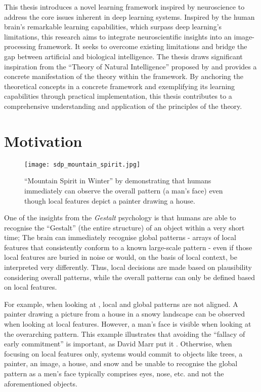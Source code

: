 This thesis introduces a novel learning framework inspired by neuroscience to address the core issues inherent in deep learning systems. Inspired by the human brain's remarkable learning capabilities, which surpass deep learning's limitations, this research aims to integrate neuroscientific insights into an image-processing framework. It seeks to overcome existing limitations and bridge the gap between artificial and biological intelligence. The thesis draws significant inspiration from the ``Theory of Natural Intelligence'' proposed by  and provides a concrete manifestation of the theory within the framework. By anchoring the theoretical concepts in a concrete framework and exemplifying its learning capabilities through practical implementation, this thesis contributes to a comprehensive understanding and application of the principles of the theory.

\section{Motivation}
\begin{figure}[h]
    \centering
    \texttt{[image: sdp\_mountain\_spirit.jpg]}
    \caption[``Mountain Spirit in Winter'' by Sandro del Prete]{``Mountain Spirit in Winter'' by  demonstrating that humans immediately can observe the overall pattern (a man's face) even though local features depict a painter drawing a house.}
\end{figure}

One of the insights from the \emph{Gestalt} psychology  is that humans are able to recognise the ``Gestalt'' (the entire structure) of an object within a very short time; The brain can immediately recognise global patterns - arrays of local features that consistently conform to a known large-scale pattern - even if those local features are buried in noise or would, on the basis of local context, be interpreted very differently. Thus, local decisions are made based on plausibility considering overall patterns, while the overall patterns can only be defined based on local features.

For example, when looking at , local and global patterns are not aligned. A painter drawing a picture from a house in a snowy landscape can be observed when looking at local features. However, a man's face is visible when looking at the overarching pattern.
This example illustrates that avoiding the ``fallacy of early commitment'' is important, as David Marr put it .
Otherwise, when focusing on local features only, systems would commit to objects like trees, a painter, an image, a house, and snow and be unable to recognise the global pattern as a men's face typically comprises eyes, nose, etc. and not the aforementioned objects.

